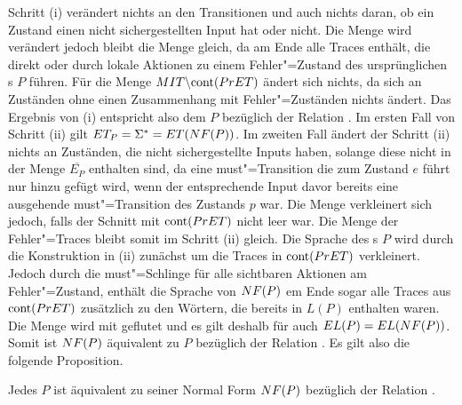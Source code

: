 Schritt (i) verändert nichts an den Transitionen und auch nichts daran, ob ein
Zustand einen nicht sichergestellten Input hat oder nicht. Die Menge \StET{}
wird verändert jedoch bleibt die Menge \PrET{} gleich, da \StET{} am Ende alle
Traces enthält, die direkt oder durch lokale Aktionen zu einem Fehler"=Zustand
des ursprünglichen \MEIO{}s $P$ führen. Für die Menge $MIT\backslash\mathrm{cont}
(PrET)$ ändert sich nichts, da sich an Zuständen ohne einen Zusammenhang mit
Fehler"=Zuständen nichts ändert. Das Ergebnis von (i) entspricht also dem
\MEIO{} $P$ bezüglich der Relation \ERel{}. Im ersten Fall von Schritt (ii)
gilt $ET _P =\Sigma ^* = ET (NF (P))$. Im zweiten Fall ändert der Schritt
(ii) nichts an Zuständen, die nicht sichergestellte Inputs haben, solange diese
nicht in der Menge $\overline{E_P}$ enthalten sind, da eine must"=Transition
die zum Zustand $e$ führt nur hinzu gefügt wird, wenn der entsprechende Input
davor bereits eine ausgehende must"=Transition des Zustands $p$ war. Die Menge
\MIT{} verkleinert sich jedoch, falls der Schnitt mit $\mathrm{cont} (PrET)$ nicht
leer war. Die Menge der Fehler"=Traces \ET{} bleibt somit im Schritt (ii)
gleich. Die Sprache des \MEIO{}s $P$ wird durch die Konstruktion in (ii)
zunächst um die Traces in $\mathrm{cont} (PrET)$ verkleinert. Jedoch durch die
must"=Schlinge für alle sichtbaren Aktionen am Fehler"=Zustand, enthält die
Sprache von $NF (P)$ em Ende sogar alle Traces aus $\mathrm{cont} (PrET)$ zusätzlich
zu den Wörtern, die bereits in $L (P)$ enthalten waren. Die Menge \EL{} wird
mit \ET{} geflutet und es gilt deshalb für \EL{} auch $EL (P) = EL (NF
(P))$. Somit ist $NF (P)$ äquivalent zu $P$ bezüglich der Relation \ERel{}. Es
gilt also die folgende Proposition.

\begin{Prop}
  \label{normalFormProp}
  Jedes \MEIO{} $P$ ist äquivalent zu seiner Normal Form $NF (P)$ bezüglich
  der Relation \ERel{}.
\end{Prop}


